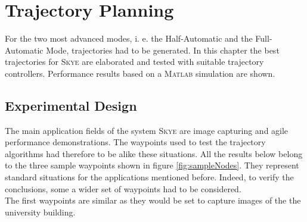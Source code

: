 \graphicspath{{graphics/}}

\chapter{Trajectory Planning}
\label{cha:trajectory}
For the two most advanced modes, i. e. the Half-Automatic and the Full-Automatic Mode, trajectories had to be generated. In this chapter the best trajectories for \textsc{Skye} are elaborated and tested with suitable trajectory controllers. Performance results based on a \textsc{Matlab} simulation are shown.


\section{Experimental Design}
\label{sec:experimental design}
The main application fields of the system \textsc{Skye} are image capturing and agile performance demonstrations. The waypoints used to test the trajectory algorithms had therefore to be alike these situations. All the results below belong to the three sample waypoints shown in figure \ref{fig:sampleNodes}. They represent standard situations for the applications mentioned before. Indeed, to verify the conclusions, some a wider set of waypoints had to be considered.
\\
The first waypoints are similar as they would be set to capture images of the the university building. 

